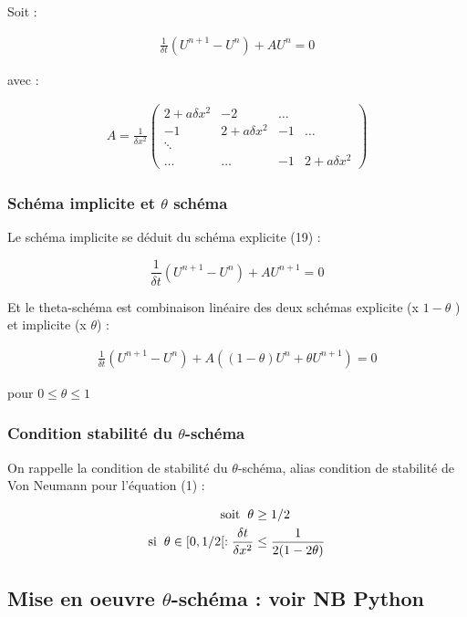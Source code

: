 \documentclass[french]{article}
\begin{document}
Soit :

\begin{align}
\frac{1}{\delta t}\left(U^{n+1}-U^{n}\right) + AU^{n}=0
\end{align}

avec :

\begin{align}
A = \frac{1}{\delta x^{2}}
\begin{pmatrix}
2+a\delta x^{2} & -2 & \hdots \\
-1 & 2+a\delta x^{2} & -1 & \hdots \\
\ddots \\
\hdots & \hdots & -1 & 2+a\delta x^{2} 
\end{pmatrix}
\end{align}

\subsubsection{Schéma implicite et $\theta $ schéma}

Le schéma implicite se déduit du schéma explicite (19) :

\[
\frac{1}{\delta t}\left(U^{n+1}-U^{n}\right) + AU^{n+1}=0
\]

Et le theta-schéma est combinaison linéaire des deux schémas explicite (x $1-\theta$ ) et implicite (x $\theta$) :

\begin{align}
\frac{1}{\delta t}\left(U^{n+1}-U^{n}\right) + 
A\left((1-\theta)U^{n}+\theta U^{n+1}\right)=0
\end{align}

pour $ 0 \leq \theta \leq 1 $

\subsubsection{Condition stabilité du $\theta$-schéma}

On rappelle la condition de stabilité du $ \theta $-schéma, alias condition de stabilité de Von Neumann pour l'équation (1) :

\begin{align}
\mathrm{soit}\hspace{2mm}\theta &\geq 1/2 \\
\mathrm{si}\hspace{2mm}\theta \in [0,1/2[ : \frac{\delta t}{\delta x^{2}} &\leq \frac{1}{2(1-2\theta)}
\end{align}

\subsection{Mise en oeuvre $\theta$-schéma : voir NB Python}
\end{document}
